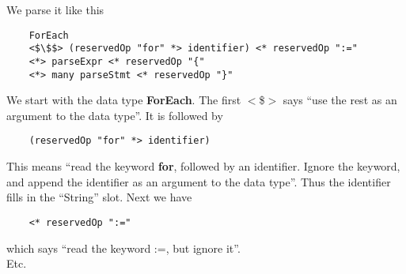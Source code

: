 We parse it like this

\begin{lstlisting}
    ForEach
    <$\$$> (reservedOp "for" *> identifier) <* reservedOp ":="
    <*> parseExpr <* reservedOp "{"
    <*> many parseStmt <* reservedOp "}"    
\end{lstlisting}

We start with the data type \textbf{ForEach}. The first $<$\$$>$ says ``use the rest as an argument to the data type''. It is followed by

\begin{lstlisting}
    (reservedOp "for" *> identifier)
\end{lstlisting}

This means ``read the keyword \textbf{for}, followed by an identifier. Ignore the keyword, and append the identifier as an argument to the data type''. Thus the identifier fills in the ``String'' slot. Next we have

\begin{lstlisting}
    <* reservedOp ":="
\end{lstlisting}

which says ``read the keyword :=, but ignore it''. \\

Etc.